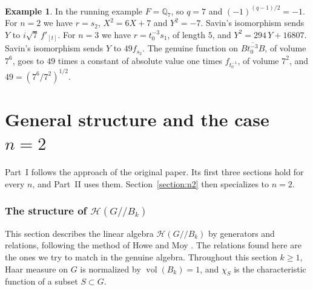 \documentclass[12pt,letterpaper]{amsart}
\numberwithin{equation}{section}
\theoremstyle{definition}
\newtheorem{example}[theorem]{Example}
\theoremstyle{remark}
\DeclareMathOperator{\vol}{vol}
\newcommand{\cH}{\mathcal{H}}
\newcommand{\Hlin}{\cH(G/\!/B_k)}
\begin{document}
\begin{example}
\label{ex:savinbg}
In the running example $F=\mathbb{Q}_7$, so $q=7$ and
$(-1)^{(q-1)/2}=-1$. For $n=2$ we have $r=s_2$, $X^2=6X+7$ and
$Y^2=-7$. Savin's isomorphism sends $Y$ to $i\sqrt7\,f'_{[t]}$. For
$n=3$ we have $r=t_0^{-3}s_1$, of length $5$, and $Y^2=294\,Y+16807$.
Savin's isomorphism sends $Y$ to $49f_{s_2}$. The genuine function on
$\overline{Bt_0^{-3}B}$, of volume $7^6$, goes to $49$ times a constant
of absolute value one times $f_{t_0^{-1}}$, of volume $7^2$, and
$49=(7^6/7^2)^{1/2}$.
\end{example}

\part{General structure and the case \texorpdfstring{$n=2$}{n=2}}

Part~I follows the approach of the original paper. Its first three
sections hold for every $n$, and Part~II uses them.
Section~\ref{section:n2} then specializes to $n=2$.

\section{The structure of \texorpdfstring{$\cH(G/\!/B_k)$}{H(G//Bk)}}
\label{section:sl2}

This section describes the linear algebra $\Hlin$ by generators and
relations, following the method of Howe and Moy \cite{HM85}. The
relations found here are the ones we try to match in the genuine
algebra. Throughout this section $k\geq 1$, Haar measure on $G$ is
normalized by $\vol(B_k)=1$, and $\chi_S$ is the characteristic
function of a subset $S\subset G$.
\end{document}
